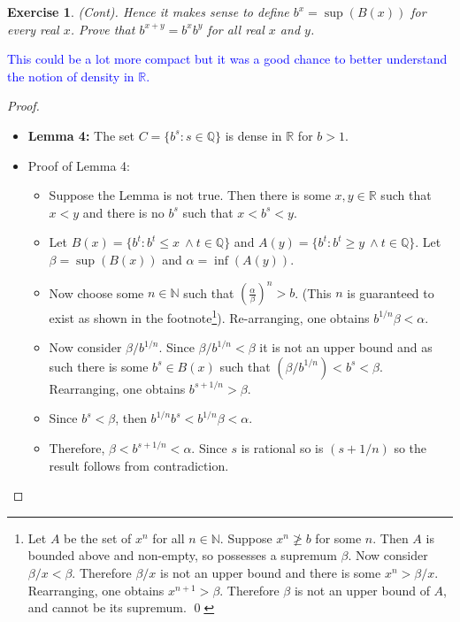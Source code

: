 \documentclass[12pt]{article}
\newtheorem{subexercise}{Exercise}[exercise]
\newcommand{\R}{\mathbb{R}}
\newcommand{\Q}{\mathbb{Q}}
\newcommand{\N}{\mathbb{N}}
\begin{document}
\begin{subexercise}
    (Cont). Hence it makes sense to define $b^x = \sup(B(x))$ for every real $x$. Prove that $b^{x+y} = b^x b^y$ for all real $x$ and $y$.
\end{subexercise}

\textcolor{blue}{This could be a lot more compact but it was a good chance to better understand the notion of density in $\R$.}

\begin{proof}
    
    \begin{itemize}
   
    \item \textbf{Lemma 4:} The set $C = \{b^s: s \in \Q\}$ is dense in $\R$ for $b > 1$.
        \item Proof of Lemma 4:
            \begin{itemize}
                \item Suppose the Lemma is not true. Then there is some $x, y \in \R$ such that $x < y$ and there is no $b^s$ such that $x < b^s < y$.
                \item Let $B(x) = \{b^t: b^t \leq x\ \land t \in \Q\}$ and $A(y) = \{b^t: b^t \geq y\ \land t \in \Q\}$. Let $\beta = \sup(B(x))$ and $\alpha = \inf(A(y))$.
                \item Now choose some $n \in \N$ such that $(\frac{\alpha}{\beta})^n > b$. (This $n$ is guaranteed to exist as shown in the footnote\footnote{Let $A$ be the set of $x^n$ for all $n \in \N$. Suppose $x^n \ngeq b$ for some $n$. Then $A$ is bounded above and non-empty, so possesses a supremum $\beta$. Now consider $\beta/x < \beta$. Therefore $\beta/x$ is not an upper bound and there is some $x^n > \beta/x$. Rearranging, one obtains $x^{n+1} > \beta$. Therefore $\beta$ is not an upper bound of $A$, and cannot be its supremum. \qed}). Re-arranging, one obtains $b^{1/n} \beta < \alpha$.
                \item Now consider $\beta/b^{1/n}$. Since $\beta/b^{1/n} < \beta$ it is not an upper bound and as such there is some $b^s \in B(x)$ such that $(\beta/b^{1/n}) < b^s < \beta$. Rearranging, one obtains $b^{s+1/n} > \beta$.
                \item Since $b^s < \beta$, then $b^{1/n} b^s  < b^{1/n} \beta < \alpha$.
                \item Therefore, $\beta < b^{s+1/n} < \alpha$. Since $s$ is rational so is $(s+1/n)$ so the result follows from contradiction.
            \end{itemize}

\end{itemize}
\end{proof}
\end{document}
